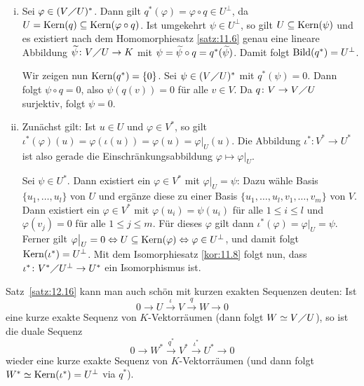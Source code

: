 \begin{beweis}
	\begin{enumerate}[(i)]
		\item Sei $\varphi \in (V \diagup U)^*$.
		Dann gilt $q^*(\varphi) = \varphi \circ q \in U^\perp$, da $U = \operatorname{Kern}(q) \subseteq \operatorname{Kern}(\varphi \circ q)$.
		Ist umgekehrt $\psi \in U^\perp$, so gilt $U \subseteq \operatorname{Kern}(\psi)$ und es existiert nach dem Homomorphiesatz \ref{satz:11.6} genau eine lineare Abbildung $\widetilde{\psi} \colon V \diagup U \rightarrow K$ mit $\psi = \widetilde{\psi} \circ q = q^*(\widetilde{\psi})$.
		Damit folgt $\operatorname{Bild}(q^*) = U^\perp$.
		
		Wir zeigen nun $\operatorname{Kern}(q^*) = \{0\}$.
		Sei $\psi \in (V \diagup U)^*$ mit $q^*(\psi) = 0$.
		Dann folgt $\psi \circ q = 0$, also $\psi(q(v))=0$ für alle $v \in V$.
		Da $q \colon V \rightarrow V \diagup U$ surjektiv, folgt $\psi = 0$.
		\item Zunächst gilt: Ist $u \in U$ und $\varphi \in V^*$, so gilt $\iota^*(\varphi)(u) = \varphi(\iota(u)) = \varphi(u) = \varphi \big|_{U}(u)$.
		Die Abbildung $\iota^* \colon V^* \rightarrow U^*$ ist also gerade die Einschränkungsabbildung $\varphi \mapsto \varphi \big|_U$.
		
		Sei $\psi \in U^*$.
		Dann existiert ein $\varphi \in V^*$ mit $\varphi \big|_U = \psi$:
		Dazu wähle Basis $\{u_1,\dots,u_l\}$ von $U$ und ergänze diese zu einer Basis $\{u_1,\dots,u_l,v_1,\dots,v_m\}$ von $V$.
		Dann existiert ein $\varphi \in V^*$ mit $\varphi(u_i) = \psi(u_i)$ für alle $1 \leq i \leq l$ und $\varphi(v_j) = 0$ für alle $1 \leq j \leq m$.
		Für dieses $\varphi$ gilt dann $\iota^*(\varphi) = \varphi \big|_U = \psi$.
		Ferner gilt $\varphi \big|_U = 0 \Leftrightarrow U \subseteq \operatorname{Kern}(\varphi) \Leftrightarrow \varphi \in U^\perp$, und damit folgt $\operatorname{Kern}(\iota^*) = U^\perp$.
		Mit dem Isomorphiesatz \ref{kor:11.8} folgt nun, dass $\iota^*\colon V^* \diagup U^\perp \rightarrow U^*$ ein Isomorphismus ist. 
	\end{enumerate}
\end{beweis}

\begin{bemerkung}
	\label{bem:12.17}
	Satz~\ref{satz:12.16} kann man auch schön mit kurzen exakten Sequenzen deuten:
	Ist
	\[
		0 \rightarrow U \xrightarrow{\iota} V \xrightarrow{q} W \rightarrow 0
	\]
	eine kurze exakte Sequenz von $K$-Vektorräumen (dann folgt $W \simeq V \diagup U$), so ist die duale Sequenz
	\[
		0 \rightarrow W^* \xrightarrow{q^*} V^* \xrightarrow{\iota^*} U^* \rightarrow 0
	\]
	wieder eine kurze exakte Sequenz von $K$-Vektorräumen (und dann folgt $W^* \simeq \operatorname{Kern}(\iota^*) = U^\perp$ via $q^*$).
\end{bemerkung}

